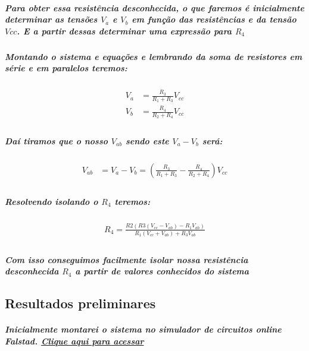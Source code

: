 \documentclass[12pt,twoside, a4paper, twocolumn]{article}
\begin{document}
\subparagraph*{Para obter essa resistência desconhecida, o que faremos é inicialmente determinar as tensões $V_a$ e $V_b$ em função das resistências e da tensão $Vcc$. E a partir dessas determinar uma expressão para $R_4$ }

\subparagraph*{Montando o sistema e equações e lembrando da soma de resistores em série e em paralelos teremos: }

\begin{equation}
    \begin{aligned}
        V_{a} & = \frac{R_3}{R_1+R_3}V_{cc} \\
        V_{b} & = \frac{R_4}{R_2+R_4}V_{cc} \\
    \end{aligned}
\end{equation}

\subparagraph*{Daí tiramos que o nosso $V_{ab}$ sendo este $V_a - V_b$ será:}

\begin{equation}
    \begin{aligned}
        V_{ab} & = V_{a} - V_{b} = \left(\frac{R_3}{R_1+R_3} - \frac{R_4}{R_2+R_4}\right)V_{cc} \\
    \end{aligned}
\end{equation}

\subparagraph*{Resolvendo isolando o $R_4$ teremos:}

\begin{equation}
    \begin{aligned}
        R_4 = \frac{R2(R3(V_{cc} - V_{ab}) - R_1V_{ab})}{R_1 (V_{cc} + V_{ab}) +R_3V_{ab}} \\
    \end{aligned}
\end{equation}

\subparagraph*{Com isso conseguimos facilmente isolar nossa resistência desconhecida $R_4$ a partir de valores conhecidos do sistema}

\subsection{Resultados preliminares}


\subparagraph*{ Inicialmente montarei o sistema no simulador de circuitos online Falstad. \href{https://www.falstad.com/circuit/circuitjs.html?ctz=CQAgjCAMB0l3BWcMBMcUHYMGZIA4UA2ATmIxAUgoqoQFMBaMMAKADcQUAWKlPPTjxDFCUMULBUpUaAhYB3QVREhsCFMNGQFq9ZpBcuAldoBOBo-sMCwhaVwzwd18HYsCU3KC3MvPXd05+MUknRT9g7l5gs10NFTUNMAwtcEo4HUTwFLjOL1is-yUggV40DIAHXKK-LwgpFiqXWypagPrvIA}{Clique aqui para acessar}}
\end{document}
